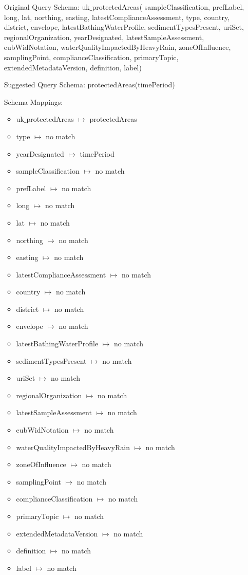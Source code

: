 \documentclass[a4paper,10pt]{article}
\begin{document}
		\begin{itemize}
\item[Original Query Schema:] uk$\_$protectedAreas( sampleClassification, prefLabel, long, lat, northing, easting,  latestComplianceAssessment, type, country, district,  envelope, latestBathingWaterProfile, sedimentTypesPresent, uriSet, regionalOrganization, yearDesignated, latestSampleAssessment, eubWidNotation, waterQualityImpactedByHeavyRain, zoneOfInfluence, samplingPoint, complianceClassification, primaryTopic, extendedMetadataVersion, definition, label)
\item[Suggested Query Schema: ]
protectedAreas(timePeriod)
\item[Schema Mappings:] 
		\begin{itemize}
		\item uk$\_$protectedAreas $\mapsto$ protectedAreas
\item type $\mapsto$ no match
\item yearDesignated $\mapsto$ timePeriod
\item sampleClassification $\mapsto$ no match
\item prefLabel $\mapsto$ no match
\item long $\mapsto$ no match
\item lat $\mapsto$ no match
\item northing $\mapsto$ no match
\item easting $\mapsto$ no match
\item latestComplianceAssessment $\mapsto$ no match
\item country $\mapsto$ no match
\item district $\mapsto$ no match
\item envelope $\mapsto$ no match
\item latestBathingWaterProfile $\mapsto$ no match
\item sedimentTypesPresent $\mapsto$ no match
\item uriSet $\mapsto$ no match
\item regionalOrganization $\mapsto$ no match
\item latestSampleAssessment $\mapsto$ no match
\item eubWidNotation $\mapsto$ no match
\item waterQualityImpactedByHeavyRain $\mapsto$ no match
\item zoneOfInfluence $\mapsto$ no match
\item samplingPoint $\mapsto$ no match
\item complianceClassification $\mapsto$ no match
\item primaryTopic $\mapsto$ no match
\item extendedMetadataVersion $\mapsto$ no match
\item definition $\mapsto$ no match
\item label $\mapsto$ no match

\end{itemize}
		\end{itemize}
		
\end{document}
